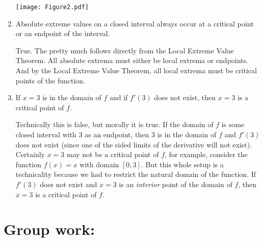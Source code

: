 \documentclass[nooutcomes]{ximera}
\begin{document}
\begin{enumerate}
\begin{freeResponse}
		\begin{image}
		\texttt{[image: Figure2.pdf]}
		\end{image}
		
		\end{freeResponse}	
		
		
		
	\item  Absolute extreme values on a closed interval always occur at a critical point or an endpoint of the interval.
		\begin{freeResponse}
		True.  The pretty much follows directly from the Local Extreme Value Theorem.  All absolute extrema must either be local extrema or endpoints.  And by the Local Extreme Value Theorem, all local extrema must be critical points of the function.  
		\end{freeResponse}	
		
		
		
	\item  If $x=3$ is in the domain of $f$ and if $f'(3)$ does not exist, then $x=3$ is a critical point of $f$.
		\begin{freeResponse}
		Technically this is false, but morally it is true.  If the domain of $f$ is some closed interval with $3$ as an endpoint, then $3$ is in the domain of $f$ and $f'(3)$ does not exist (since one of the sided limits of the derivative will not exist).  Certainly $x=3$ may not be a critical point of $f$, for example, consider the function $f(x) = x$ with domain $[0,3]$.  But this whole setup is a technicality because we had to restrict the natural domain of the function.  If $f'(3)$ does not exist and $x=3$ is an \emph{interior} point of the domain of $f$, then $x=3$ is a critical point of $f$.  
		\end{freeResponse}	
		
		
		
	\end{enumerate}
		
		
		

	
	
	
	
	

\section*{Group work:}
\end{document}
